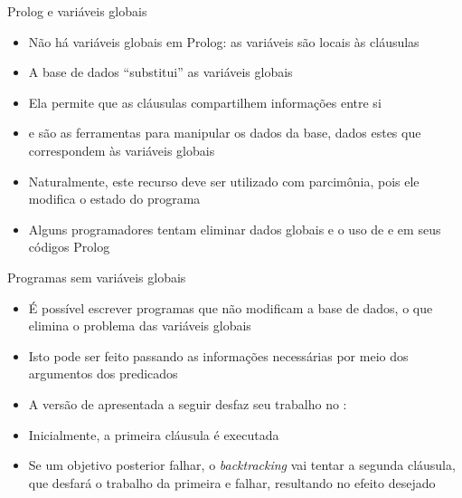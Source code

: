 \begin{frame}[fragile]{Prolog e variáveis globais}

    \begin{itemize}
        \item Não há variáveis globais em Prolog: as variáveis são locais às cláusulas

        \item A base de dados ``substitui'' as variáveis globais

        \item Ela permite que as cláusulas compartilhem informações entre si

        \item {} e  são as ferramentas para 
            manipular os dados da base, dados estes que correspondem às variáveis globais

        \item Naturalmente, este recurso deve ser utilizado com parcimônia, pois 
            ele modifica o estado do programa

        \item Alguns programadores tentam eliminar dados globais e o uso de 
             e  em seus códigos Prolog
 
    \end{itemize}

\end{frame}

\begin{frame}[fragile]{Programas sem variáveis globais}

    \begin{itemize}

        \item É possível escrever programas que não modificam a base de dados, o que elimina o 
            problema das variáveis globais

        \item Isto pode ser feito passando as informações necessárias por meio dos argumentos 
            dos predicados

        \item A versão de  apresentada a seguir desfaz seu trabalho no 
            :


        \item Inicialmente, a primeira cláusula é executada

        \item Se um objetivo posterior falhar, o \textit{backtracking} vai tentar a segunda 
            cláusula, que desfará o trabalho da primeira e falhar, resultando no efeito 
            desejado

    \end{itemize}

\end{frame}
